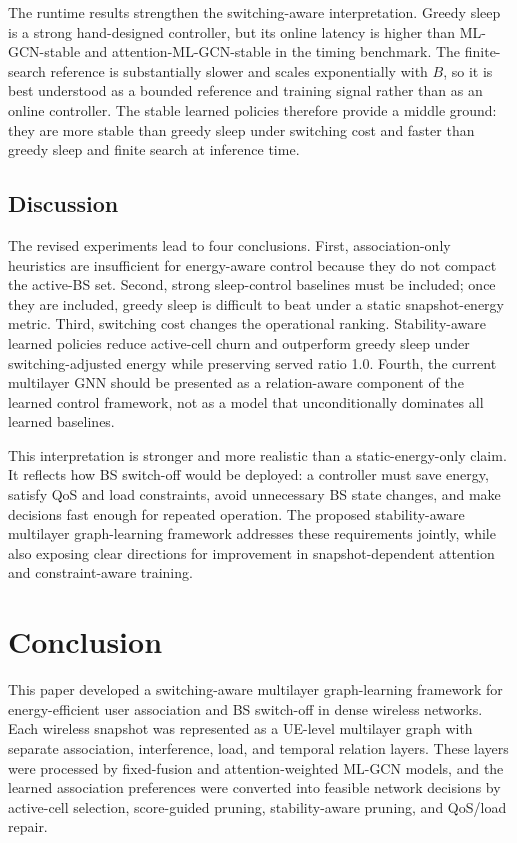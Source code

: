 \documentclass[journal]{IEEEtran}
\begin{document}
The runtime results strengthen the switching-aware interpretation. Greedy
sleep is a strong hand-designed controller, but its online latency is higher
than ML-GCN-stable and attention-ML-GCN-stable in the timing benchmark. The
finite-search reference is substantially slower and scales exponentially with
$B$, so it is best understood as a bounded reference and training signal rather
than as an online controller. The stable learned policies therefore provide a
middle ground: they are more stable than greedy sleep under switching cost and
faster than greedy sleep and finite search at inference time.

\subsection{Discussion}
The revised experiments lead to four conclusions. First, association-only
heuristics are insufficient for energy-aware control because they do not
compact the active-BS set. Second, strong sleep-control baselines must be
included; once they are included, greedy sleep is difficult to beat under a
static snapshot-energy metric. Third, switching cost changes the operational
ranking. Stability-aware learned policies reduce active-cell churn and
outperform greedy sleep under switching-adjusted energy while preserving
served ratio 1.0. Fourth, the current multilayer GNN should be presented as a
relation-aware component of the learned control framework, not as a model that
unconditionally dominates all learned baselines.

This interpretation is stronger and more realistic than a static-energy-only
claim. It reflects how BS switch-off would be deployed: a controller must save
energy, satisfy QoS and load constraints, avoid unnecessary BS state changes,
and make decisions fast enough for repeated operation. The proposed
stability-aware multilayer graph-learning framework addresses these
requirements jointly, while also exposing clear directions for improvement in
snapshot-dependent attention and constraint-aware training.

\section{Conclusion}
This paper developed a switching-aware multilayer graph-learning framework for
energy-efficient user association and BS switch-off in dense wireless networks.
Each wireless snapshot was represented as a UE-level multilayer graph with
separate association, interference, load, and temporal relation layers. These
layers were processed by fixed-fusion and attention-weighted ML-GCN models,
and the learned association preferences were converted into feasible network
decisions by active-cell selection, score-guided pruning, stability-aware
pruning, and QoS/load repair.
\end{document}
